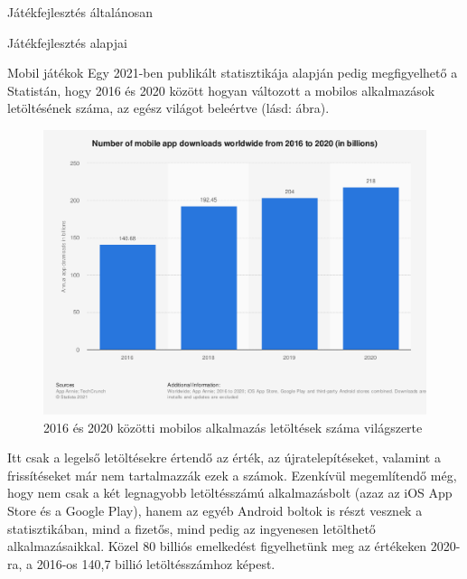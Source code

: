\begin{MyChapter}{Játékfejlesztés általánosan}
\begin{MySection}{Játékfejlesztés alapjai}
\begin{MySubSection}{Mobil játékok}
		Egy 2021-ben publikált statisztikája alapján pedig megfigyelhető a Statistán, hogy 2016 és 2020 között hogyan változott a mobilos alkalmazások letöltésének száma, az egész világot beleértve (lásd:  ábra).
		\begin{figure}[h!]
			\centering
			\includegraphics[scale=0.40]{kepek/mobil/annual_number_of_global_mobile_app_downloads_2016-2020.png}
			\caption{2016 és 2020 közötti mobilos alkalmazás letöltések száma világszerte}
			\label{fig:mobil:annual_number_of_global_mobile_app_downloads_2016-2020}
		\end{figure}
	
		Itt csak a legelső letöltésekre értendő az érték, az újratelepítéseket, valamint a frissítéseket már nem tartalmazzák ezek a számok. Ezenkívül megemlítendő még, hogy nem csak a két legnagyobb letöltésszámú alkalmazásbolt (azaz az iOS App Store és a Google Play), hanem az egyéb Android boltok is részt vesznek a statisztikában, mind a fizetős, mind pedig az ingyenesen letölthető alkalmazásaikkal. Közel 80 billiós emelkedést figyelhetünk meg az értékeken 2020-ra, a 2016-os 140,7 billió letöltésszámhoz képest.
		

\end{MySubSection}
\end{MySection}
\end{MyChapter}
